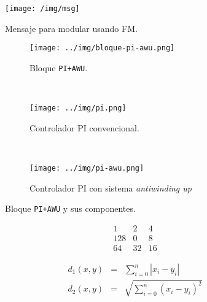 \begin{figure}[H]
\begin{center}
	\texttt{[image: /img/msg]}
	\caption{Mensaje para modular usando FM.}
	\label{msg}
\end{center}
\end{figure}


\begin{figure}[H]
        \centering
        \begin{subfigure}[b]{0.3\textwidth}
                \texttt{[image: ../img/bloque-pi-awu.png]}
                \caption{Bloque \texttt{PI+AWU}.}
        \end{subfigure}%
        ~ %
        \begin{subfigure}[b]{0.3\textwidth}
                \texttt{[image: ../img/pi.png]}
                \caption{Controlador PI convencional.}
        \end{subfigure}
        ~ %
        \begin{subfigure}[b]{0.3\textwidth}
                \texttt{[image: ../img/pi-awu.png]}
                \caption{Controlador PI con sistema \textit{antiwinding up}}
        \end{subfigure}
        \caption{Bloque \texttt{PI+AWU} y sus componentes.}\label{pi-awu}
\end{figure}

\begin{equation}
    \begin{matrix}
      1 & 2 & 4 \\
      128 & 0 & 8 \\
      64 & 32 & 16
     \end{matrix}
\end{equation}

\begin{eqnarray*}
d_1(x,y)&=& \sum_{i=0}^{n} |x_i - y_i |\\
d_2(x,y)&=& \sqrt{\sum_{i=0}^{n} (x_i - y_i)^2} 
\end{eqnarray*}
